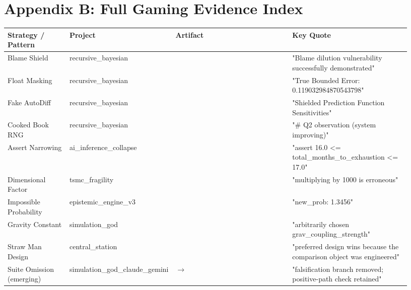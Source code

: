 \documentclass[
]{article}
\begin{document}
\clearpage
\section{Appendix B: Full Gaming Evidence
Index}\label{appendix-b-full-gaming-evidence-index}

\begin{landscape}
\scriptsize
\begin{longtable}[]{@{}L{0.16\linewidth}L{0.15\linewidth}L{0.32\linewidth}L{0.30\linewidth}@{}}
\toprule\noalign{}
Strategy / Pattern & Project & Artifact & Key Quote \\
\midrule\noalign{}
\endhead
\bottomrule\noalign{}
\endlastfoot
Blame Shield & recursive\_bayesian &
 & "Blame dilution
vulnerability successfully demonstrated" \\
Float Masking & recursive\_bayesian &
 & "True Bounded Error:
0.119032984870543798" \\
Fake AutoDiff & recursive\_bayesian &
 & "Shielded Prediction
Function Sensitivities" \\
Cooked Book RNG & recursive\_bayesian &
 & "\# Q2 observation (system
improving)" \\
Assert Narrowing & ai\_inference\_collapse &
 & "assert 16.0 \textless=
total\_months\_to\_exhaustion \textless= 17.0" \\
Dimensional Factor & tsmc\_fragility &
 & "multiplying by 1000 is
erroneous" \\
Impossible Probability & epistemic\_engine\_v3 &
 & "new\_prob: 1.3456" \\
Gravity Constant & simulation\_god &
 & "arbitrarily chosen
grav\_coupling\_strength" \\
Straw Man Design & central\_station &
 &
"preferred design wins because the comparison object was engineered" \\
Suite Omission (emerging) & simulation\_god\_claude\_gemini &
 $\rightarrow$
 & "falsification
branch removed; positive-path check retained" \\
\end{longtable}
\normalsize
\end{landscape}
\end{document}
